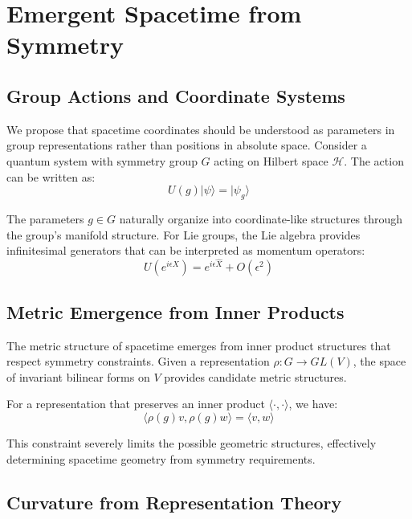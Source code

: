 \documentclass[12pt]{article}
\begin{document}
\section{Emergent Spacetime from Symmetry}

\subsection{Group Actions and Coordinate Systems}

We propose that spacetime coordinates should be understood as parameters in group representations rather than positions in absolute space. Consider a quantum system with symmetry group $G$ acting on Hilbert space $\mathcal{H}$. The action can be written as:
\begin{equation}
U(g)|\psi\rangle = |\psi_g\rangle
\end{equation}

The parameters $g \in G$ naturally organize into coordinate-like structures through the group's manifold structure. For Lie groups, the Lie algebra provides infinitesimal generators that can be interpreted as momentum operators:
\begin{equation}
U(e^{i\epsilon X}) = e^{i\epsilon \hat{X}} + O(\epsilon^2)
\end{equation}

\subsection{Metric Emergence from Inner Products}

The metric structure of spacetime emerges from inner product structures that respect symmetry constraints. Given a representation $\rho: G \to GL(V)$, the space of invariant bilinear forms on $V$ provides candidate metric structures.

For a representation that preserves an inner product $\langle \cdot, \cdot \rangle$, we have:
\begin{equation}
\langle \rho(g)v, \rho(g)w \rangle = \langle v, w \rangle
\end{equation}

This constraint severely limits the possible geometric structures, effectively determining spacetime geometry from symmetry requirements.

\subsection{Curvature from Representation Theory}
\end{document}
